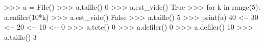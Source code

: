 \documentclass[
  a4paper,
  DIV=11,
  numbers=noendperiod]{scrartcl}
\newenvironment{Shaded}{\begin{snugshade}}{\end{snugshade}}
\newcommand{\BuiltInTok}[1]{\textcolor[rgb]{0.00,0.23,0.31}{#1}}
\newcommand{\ControlFlowTok}[1]{\textcolor[rgb]{0.00,0.23,0.31}{#1}}
\newcommand{\DecValTok}[1]{\textcolor[rgb]{0.68,0.00,0.00}{#1}}
\newcommand{\KeywordTok}[1]{\textcolor[rgb]{0.00,0.23,0.31}{#1}}
\newcommand{\NormalTok}[1]{\textcolor[rgb]{0.00,0.23,0.31}{#1}}
\newcommand{\OperatorTok}[1]{\textcolor[rgb]{0.37,0.37,0.37}{#1}}
\newcommand{\VariableTok}[1]{\textcolor[rgb]{0.07,0.07,0.07}{#1}}
\begin{document}
\begin{Shaded}
\begin{Highlighting}[]
\OperatorTok{\textgreater{}\textgreater{}\textgreater{}}\NormalTok{ a }\OperatorTok{=}\NormalTok{ File()}
\OperatorTok{\textgreater{}\textgreater{}\textgreater{}}\NormalTok{ a.taille()}
\DecValTok{0}
\OperatorTok{\textgreater{}\textgreater{}\textgreater{}}\NormalTok{ a.est\_vide()}
\VariableTok{True}
\OperatorTok{\textgreater{}\textgreater{}\textgreater{}} \ControlFlowTok{for}\NormalTok{ k }\KeywordTok{in} \BuiltInTok{range}\NormalTok{(}\DecValTok{5}\NormalTok{):}
\NormalTok{        a.enfiler(}\DecValTok{10}\OperatorTok{*}\NormalTok{k)}
\OperatorTok{\textgreater{}\textgreater{}\textgreater{}}\NormalTok{ a.est\_vide()}
\VariableTok{False}
\OperatorTok{\textgreater{}\textgreater{}\textgreater{}}\NormalTok{ a.taille()}
\DecValTok{5}
\OperatorTok{\textgreater{}\textgreater{}\textgreater{}} \BuiltInTok{print}\NormalTok{(a)}
\DecValTok{40} \OperatorTok{\textless{}{-}{-}} \DecValTok{30} \OperatorTok{\textless{}{-}{-}} \DecValTok{20} \OperatorTok{\textless{}{-}{-}} \DecValTok{10} \OperatorTok{\textless{}{-}{-}} \DecValTok{0}
\OperatorTok{\textgreater{}\textgreater{}\textgreater{}}\NormalTok{ a.tete()}
\DecValTok{0}
\OperatorTok{\textgreater{}\textgreater{}\textgreater{}}\NormalTok{ a.defiler()}
\DecValTok{0}
\OperatorTok{\textgreater{}\textgreater{}\textgreater{}}\NormalTok{ a.defiler()}
\DecValTok{10}
\OperatorTok{\textgreater{}\textgreater{}\textgreater{}}\NormalTok{ a.taille()}
\DecValTok{3}
\end{Highlighting}
\end{Shaded}
\end{document}
